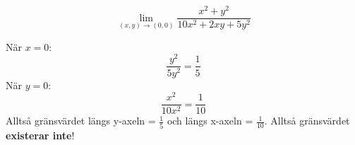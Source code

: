 \documentclass{report}
\begin{document}
{
\begin{equation*}
\lim_{(x,y) \to (0,0) } \frac{x^2+y^2}{10x^2+2xy+5y^2} 
\end{equation*}

När $ x = 0 $:
\begin{equation*}
\frac{y^2}{5y^2}  = \frac{1}{5} 
\end{equation*}
När $ y = 0 $:
\begin{equation*}
\frac{x^2}{10x^2} = \frac{1}{10} 
\end{equation*}
Alltså gränsvärdet längs y-axeln = $ \frac{1}{5}  $ och längs x-axeln = $ \frac{1}{10}  $. Alltså gränsvärdet \textbf{existerar inte}! 
}
\end{document}
